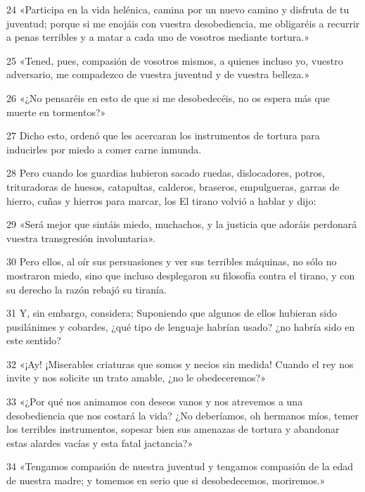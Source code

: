 \par 24 «Participa en la vida helénica, camina por un nuevo camino y disfruta de tu juventud; porque si me enojáis con vuestra desobediencia, me obligaréis a recurrir a penas terribles y a matar a cada uno de vosotros mediante tortura.»

\par 25 «Tened, pues, compasión de vosotros mismos, a quienes incluso yo, vuestro adversario, me compadezco de vuestra juventud y de vuestra belleza.»

\par 26 «¿No pensaréis en esto de que si me desobedecéis, no os espera más que muerte en tormentos?»

\par 27 Dicho esto, ordenó que les acercaran los instrumentos de tortura para inducirles por miedo a comer carne inmunda.

\par 28 Pero cuando los guardias hubieron sacado ruedas, dislocadores, potros, trituradoras de huesos, catapultas, calderos, braseros, empulgueras, garras de hierro, cuñas y hierros para marcar, los El tirano volvió a hablar y dijo:

\par 29 «Será mejor que sintáis miedo, muchachos, y la justicia que adoráis perdonará vuestra transgresión involuntaria».

\par 30 Pero ellos, al oír sus persuasiones y ver sus terribles máquinas, no sólo no mostraron miedo, sino que incluso desplegaron su filosofía contra el tirano, y con su derecho la razón rebajó su tiranía.

\par 31 Y, sin embargo, considera; Suponiendo que algunos de ellos hubieran sido pusilánimes y cobardes, ¿qué tipo de lenguaje habrían usado? ¿no habría sido en este sentido?

\par 32 «¡Ay! ¡Miserables criaturas que somos y necios sin medida! Cuando el rey nos invite y nos solicite un trato amable, ¿no le obedeceremos?»

\par 33 «¿Por qué nos animamos con deseos vanos y nos atrevemos a una desobediencia que nos costará la vida? ¿No deberíamos, oh hermanos míos, temer los terribles instrumentos, sopesar bien sus amenazas de tortura y abandonar estas alardes vacías y esta fatal jactancia?»

\par 34 «Tengamos compasión de nuestra juventud y tengamos compasión de la edad de nuestra madre; y tomemos en serio que si desobedecemos, moriremos.»

